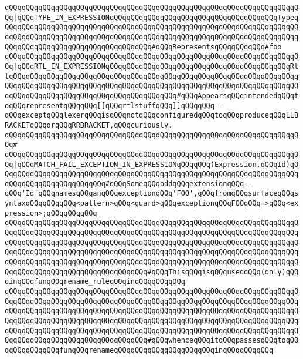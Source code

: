 \verb|qQQqqQQqqQQqqQQqqQQqqQQqqQQqqQQqqQQqqQQqqQQqqQQqqQQqqQQqqQQqqQQqqQQqqQQq|\verb#|qQQqTYPE_IN_EXPRESSIONqQQqqQQqqQQqqQQqqQQqqQQqqQQqqQQqqQQqqQQqTypeqQQqqQQqqQQqqQQqqQQqqQQqqQQqqQQqqQQqqQQqqQQqqQQqqQQqqQQqqQQqqQQqqQQqqQQqqQQqqQQqqQQqqQQqqQQqqQQqqQQqqQQqqQQqqQQqqQQqqQQqqQQqqQQqqQQqqQQqqQQqqQQqqQQqqQQqqQQqqQQqqQQqqQQqqQQqqQQq#\verb|#qQQqRepresentsqQQqqQQqqQQq#foo|\newline
\verb|qQQqqQQqqQQqqQQqqQQqqQQqqQQqqQQqqQQqqQQqqQQqqQQqqQQqqQQqqQQqqQQqqQQqqQQq|\verb#|qQQqRTL_IN_EXPRESSIONqQQqqQQqqQQqqQQqqQQqqQQqqQQqqQQqqQQqqQQqqQQqRtlqQQqqQQqqQQqqQQqqQQqqQQqqQQqqQQqqQQqqQQqqQQqqQQqqQQqqQQqqQQqqQQqqQQqqQQqqQQqqQQqqQQqqQQqqQQqqQQqqQQqqQQqqQQqqQQqqQQqqQQqqQQqqQQqqQQqqQQqqQQqqQQqqQQqqQQqqQQqqQQqqQQqqQQqqQQqqQQqqQQq#\verb|#qQQqAppearsqQQqintendedqQQqtoqQQqrepresentqQQqqQQq[[qQQqrtlstuffqQQq]]qQQqqQQq--qQQqexceptqQQqlexerqQQqisqQQqnotqQQqconfiguredqQQqtoqQQqproduceqQQqLLBRACKETqQQqorqQQqRRBRACKET,qQQqcuriously.|\newline
\verb|qQQqqQQqqQQqqQQqqQQqqQQqqQQqqQQqqQQqqQQqqQQqqQQqqQQqqQQqqQQqqQQqqQQqqQQq#|\newline
\verb|qQQqqQQqqQQqqQQqqQQqqQQqqQQqqQQqqQQqqQQqqQQqqQQqqQQqqQQqqQQqqQQqqQQqqQQq|\verb#|qQQqMATCH_FAIL_EXCEPTION_IN_EXPRESSIONqQQqqQQq(Expression,qQQqId)qQQqqQQqqQQqqQQqqQQqqQQqqQQqqQQqqQQqqQQqqQQqqQQqqQQqqQQqqQQqqQQqqQQqqQQqqQQqqQQqqQQqqQQqqQQqqQQq#\verb|#qQQqSomeqQQqoddqQQqextensionqQQq--qQQq'Id'qQQqnamesqQQqanqQQqexceptionqQQq'FOO',qQQqfromqQQqsurfaceqQQqsyntaxqQQqqQQqqQQq<pattern>qQQq<guard>qQQqexceptionqQQqFOOqQQq=>qQQq<expression>;qQQqqQQqqQQq|\newline
\verb|qQQqqQQqqQQqqQQqqQQqqQQqqQQqqQQqqQQqqQQqqQQqqQQqqQQqqQQqqQQqqQQqqQQqqQQqqQQqqQQqqQQqqQQqqQQqqQQqqQQqqQQqqQQqqQQqqQQqqQQqqQQqqQQqqQQqqQQqqQQqqQQqqQQqqQQqqQQqqQQqqQQqqQQqqQQqqQQqqQQqqQQqqQQqqQQqqQQqqQQqqQQqqQQqqQQqqQQqqQQqqQQqqQQqqQQqqQQqqQQqqQQqqQQqqQQqqQQqqQQqqQQqqQQqqQQqqQQqqQQqqQQqqQQqqQQqqQQqqQQqqQQqqQQqqQQqqQQqqQQqqQQqqQQqqQQqqQQqqQQqqQQqqQQqqQQqqQQqqQQqqQQqqQQqqQQqqQQqqQQqqQQq#qQQqThisqQQqisqQQqusedqQQq(only)qQQqinqQQqfunqQQqrename_ruleqQQqinqQQqqQQqqQQq|\newline
\verb|qQQqqQQqqQQqqQQqqQQqqQQqqQQqqQQqqQQqqQQqqQQqqQQqqQQqqQQqqQQqqQQqqQQqqQQqqQQqqQQqqQQqqQQqqQQqqQQqqQQqqQQqqQQqqQQqqQQqqQQqqQQqqQQqqQQqqQQqqQQqqQQqqQQqqQQqqQQqqQQqqQQqqQQqqQQqqQQqqQQqqQQqqQQqqQQqqQQqqQQqqQQqqQQqqQQqqQQqqQQqqQQqqQQqqQQqqQQqqQQqqQQqqQQqqQQqqQQqqQQqqQQqqQQqqQQqqQQqqQQqqQQqqQQqqQQqqQQqqQQqqQQqqQQqqQQqqQQqqQQqqQQqqQQqqQQqqQQqqQQqqQQqqQQqqQQqqQQqqQQqqQQqqQQqqQQqqQQqqQQqqQQq#qQQqwhenceqQQqitqQQqpassesqQQqtoqQQqqQQqqQQqqQQqfunqQQqrenameqQQqqQQqqQQqqQQqqQQqqQQqinqQQqqQQqqQQq|\newline
